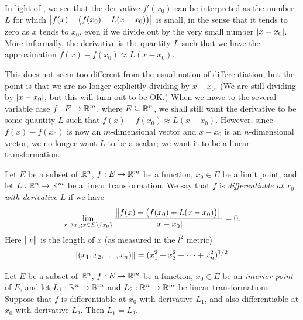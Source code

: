 \begin{note}
  In light of , we see that the derivative \(f'(x_0)\) can be interpreted as the number \(L\) for which \(\abs{f(x) - \big(f(x_0) + L(x - x_0)\big)}\) is small, in the sense that it tends to zero as \(x\) tends to \(x_0\), even if we divide out by the very small number \(\abs{x - x_0}\).
  More informally, the derivative is the quantity \(L\) such that we have the approximation \(f(x) - f(x_0) \approx L(x - x_0)\).

  This does not seem too different from the usual notion of differentiation, but the point is that we are no longer explicitly dividing by \(x - x_0\).
  (We are still dividing by \(\abs{x - x_0}\), but this will turn out to be OK.)
  When we move to the several variable case \(f : E \to \R^m\), where \(E \subseteq \R^n\), we shall still want the derivative to be some quantity \(L\) such that \(f(x) - f(x_0) \approx L(x - x_0)\).
  However, since \(f(x) - f(x_0)\) is now an \(m\)-dimensional vector and \(x - x_0\) is an \(n\)-dimensional vector, we no longer want \(L\) to be a scalar;
  we want it to be a linear transformation.
\end{note}

\begin{defn}[Differentiability]\label{ii:6.2.2}
  Let \(E\) be a subset of \(\R^n\), \(f : E \to \R^m\) be a function, \(x_0 \in E\) be a limit point, and let \(L : \R^n \to \R^m\) be a linear transformation.
  We say that \(f\) is \emph{differentiable at \(x_0\) with derivative \(L\)} if we have
  \[
    \lim_{x \to x_0 ; x \in E \setminus \set{x_0}} \dfrac{\norm*{f(x) - \big(f(x_0) + L(x - x_0)\big)}}{\norm*{x - x_0}} = 0.
  \]
  Here \(\norm*{x}\) is the length of \(x\) (as measured in the \(l^2\) metric)
  \[
    \norm*{(x_1, x_2, \dots, x_n)} = (x_1^2 + x_2^2 + \dots + x_n^2)^{1 / 2}.
  \]
\end{defn}

\setcounter{thm}{3}
\begin{lem}\label{ii:6.2.4}
  Let \(E\) be a subset of \(\R^n\), \(f : E \to \R^m\) be a function, \(x_0 \in E\) be an \emph{interior point} of \(E\), and let \(L_1 : \R^n \to \R^m\) and \(L_2 : \R^n \to \R^m\) be linear transformations.
  Suppose that \(f\) is differentiable at \(x_0\) with derivative \(L_1\), and also differentiable at \(x_0\) with derivative \(L_2\).
  Then \(L_1 = L_2\).
\end{lem}

